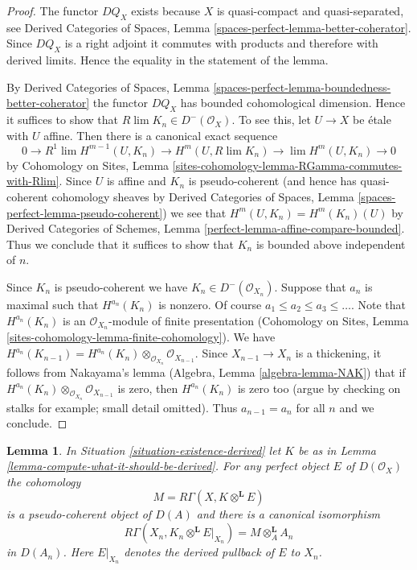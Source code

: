 \documentclass{stacks-project}
\theoremstyle{plain}
\newtheorem{lemma}[subsection]{Lemma}
\theoremstyle{definition}
\theoremstyle{remark}
\numberwithin{equation}{subsection}
\def\lim{\mathop{\mathrm{lim}}\nolimits}
\begin{document}
\begin{proof}
The functor $DQ_X$ exists because $X$ is quasi-compact and
quasi-separated, see Derived Categories of Spaces, Lemma
\ref{spaces-perfect-lemma-better-coherator}.
Since $DQ_X$ is a right adjoint it commutes with products
and therefore with derived limits. Hence the equality
in the statement of the lemma.

\medskip\noindent
By Derived Categories of Spaces,
Lemma \ref{spaces-perfect-lemma-boundedness-better-coherator}
the functor $DQ_X$ has bounded cohomological dimension.
Hence it suffices to show that $R\lim K_n \in D^-(\mathcal{O}_X)$.
To see this, let $U \to X$ be \'etale with $U$ affine.
Then there is a canonical exact sequence
$$
0 \to
R^1\lim H^{m - 1}(U, K_n) \to H^m(U, R\lim K_n) \to
\lim H^m(U, K_n) \to 0
$$
by Cohomology on Sites, Lemma
\ref{sites-cohomology-lemma-RGamma-commutes-with-Rlim}.
Since $U$ is affine and $K_n$ is pseudo-coherent (and hence has
quasi-coherent cohomology sheaves by
Derived Categories of Spaces, Lemma \ref{spaces-perfect-lemma-pseudo-coherent})
we see that $H^m(U, K_n) = H^m(K_n)(U)$ by
Derived Categories of Schemes, Lemma \ref{perfect-lemma-affine-compare-bounded}.
Thus we conclude that it suffices to show that $K_n$
is bounded above independent of $n$.

\medskip\noindent
Since $K_n$ is pseudo-coherent we have $K_n \in D^-(\mathcal{O}_{X_n})$.
Suppose that $a_n$ is maximal such that $H^{a_n}(K_n)$ is nonzero.
Of course $a_1 \leq a_2 \leq a_3 \leq \ldots$.
Note that $H^{a_n}(K_n)$ is an
$\mathcal{O}_{X_n}$-module of finite presentation
(Cohomology on Sites, Lemma
\ref{sites-cohomology-lemma-finite-cohomology}).
We have $H^{a_n}(K_{n - 1}) =
H^{a_n}(K_n) \otimes_{\mathcal{O}_{X_n}} \mathcal{O}_{X_{n - 1}}$.
Since $X_{n - 1} \to X_n$ is a thickening, it follows from
Nakayama's lemma (Algebra, Lemma \ref{algebra-lemma-NAK}) that if
$H^{a_n}(K_n) \otimes_{\mathcal{O}_{X_n}} \mathcal{O}_{X_{n - 1}}$
is zero, then $H^{a_n}(K_n)$ is zero too (argue by checking on stalks
for example; small detail omitted).
Thus $a_{n - 1} = a_n$ for all $n$ and we conclude.
\end{proof}

\begin{lemma}
\label{lemma-compute-against-perfect-derived}
In Situation \ref{situation-existence-derived} let $K$ be as in
Lemma \ref{lemma-compute-what-it-should-be-derived}. For any perfect
object $E$ of $D(\mathcal{O}_X)$ the cohomology
$$
M = R\Gamma(X, K \otimes^\mathbf{L} E)
$$
is a pseudo-coherent object of $D(A)$ and there is a canonical isomorphism
$$
R\Gamma(X_n, K_n \otimes^\mathbf{L} E|_{X_n}) = M \otimes_A^\mathbf{L} A_n
$$
in $D(A_n)$. Here $E|_{X_n}$ denotes the derived pullback of $E$ to $X_n$.
\end{lemma}
\end{document}
